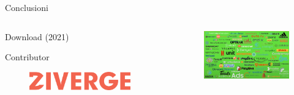 \begin{frame}{Conclusioni}
  \begin{columns}
    \begin{column}{.25\textwidth}
      \begin{block}{\centering Download (2021)}
        \vspace{2mm}
        \vspace{2mm}
      \end{block}
      \begin{block}{\centering Contributor}
        \begin{figure}
          \centering
          \includegraphics[width=0.9\textwidth]{img/ziverge.png}
          \label{ziverge.}
        \end{figure}
      \end{block}
    \end{column}
    \begin{column}{.5\textwidth}
      \begin{figure}
        \centering
        \includegraphics[width=1\textwidth]{img/companies.png}
        \label{companies adopted ZIO.}
      \end{figure}
    \end{column}
    
  \end{columns}
  
\end{frame}
